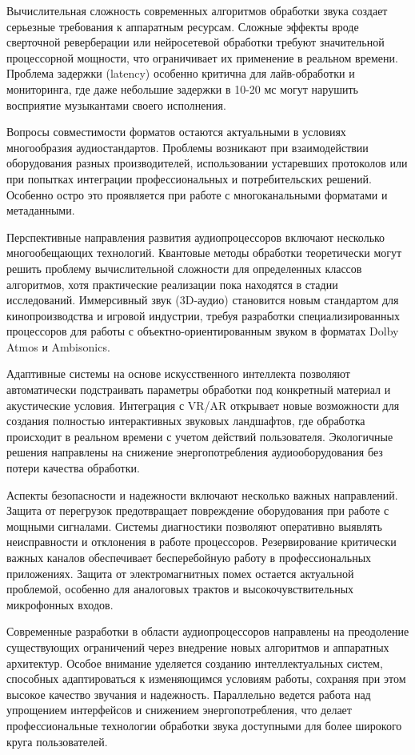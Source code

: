 Вычислительная сложность современных алгоритмов обработки звука создает серьезные требования к аппаратным ресурсам. Сложные эффекты вроде сверточной реверберации или нейросетевой обработки требуют значительной процессорной мощности, что ограничивает их применение в реальном времени. Проблема задержки (latency) особенно критична для лайв-обработки и мониторинга, где даже небольшие задержки в 10-20 мс могут нарушить восприятие музыкантами своего исполнения.

Вопросы совместимости форматов остаются актуальными в условиях многообразия аудиостандартов. Проблемы возникают при взаимодействии оборудования разных производителей, использовании устаревших протоколов или при попытках интеграции профессиональных и потребительских решений. Особенно остро это проявляется при работе с многоканальными форматами и метаданными.

Перспективные направления развития аудиопроцессоров включают несколько многообещающих технологий. Квантовые методы обработки теоретически могут решить проблему вычислительной сложности для определенных классов алгоритмов, хотя практические реализации пока находятся в стадии исследований. Иммерсивный звук (3D-аудио) становится новым стандартом для кинопроизводства и игровой индустрии, требуя разработки специализированных процессоров для работы с объектно-ориентированным звуком в форматах Dolby Atmos и Ambisonics.

Адаптивные системы на основе искусственного интеллекта позволяют автоматически подстраивать параметры обработки под конкретный материал и акустические условия. Интеграция с VR/AR открывает новые возможности для создания полностью интерактивных звуковых ландшафтов, где обработка происходит в реальном времени с учетом действий пользователя. Экологичные решения направлены на снижение энергопотребления аудиооборудования без потери качества обработки.

Аспекты безопасности и надежности включают несколько важных направлений. Защита от перегрузок предотвращает повреждение оборудования при работе с мощными сигналами. Системы диагностики позволяют оперативно выявлять неисправности и отклонения в работе процессоров. Резервирование критически важных каналов обеспечивает бесперебойную работу в профессиональных приложениях. Защита от электромагнитных помех остается актуальной проблемой, особенно для аналоговых трактов и высокочувствительных микрофонных входов.

Современные разработки в области аудиопроцессоров направлены на преодоление существующих ограничений через внедрение новых алгоритмов и аппаратных архитектур. Особое внимание уделяется созданию интеллектуальных систем, способных адаптироваться к изменяющимся условиям работы, сохраняя при этом высокое качество звучания и надежность. Параллельно ведется работа над упрощением интерфейсов и снижением энергопотребления, что делает профессиональные технологии обработки звука доступными для более широкого круга пользователей.


